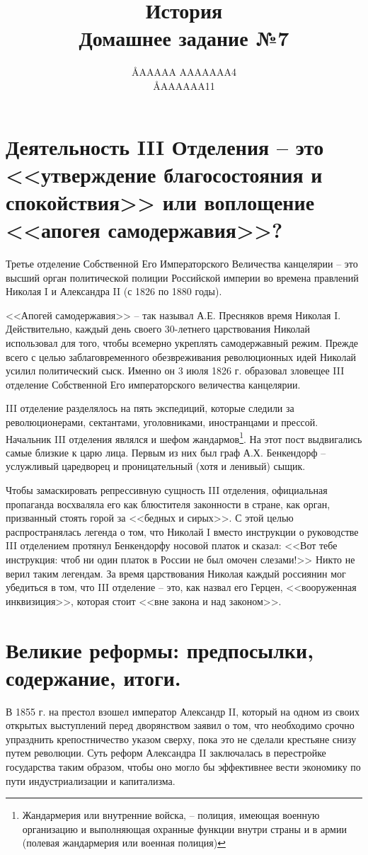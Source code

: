 \documentclass[12pt]{article}
\title{История \\ Домашнее задание №7}
\author{\AA{AAAAA AAAAAAA}{4} \\ \AA{AAAAAA}{11}}
\begin{document}
  \maketitle

  \section{Деятельность III Отделения -- это <<утверждение благосостояния и спокойствия>> или воплощение <<апогея самодержавия>>?}
  Третье отделение Собственной Его Императорского Величества канцелярии -- это высший орган политической полиции Российской империи во времена правлений Николая I и Александра II (с 1826 по 1880 годы).

  <<Апогей самодержавия>> -- так называл А.Е. Пресняков время Николая I.
  Действительно, каждый день своего 30-летнего царствования Николай использовал для того, чтобы всемерно укреплять самодержавный режим.
  Прежде всего с целью заблаговременного обезвреживания революционных идей Николай усилил политический сыск.
  Именно он 3 июля 1826 г. образовал зловещее III отделение Собственной Его императорского величества канцелярии.

  III отделение разделялось на пять экспедиций, которые следили за революционерами, сектантами, уголовниками, иностранцами и прессой.
  Начальник III отделения являлся и шефом жандармов\footnote{Жандармерия или внутренние войска, -- полиция, имеющая военную организацию и выполняющая охранные функции внутри страны и в армии (полевая жандармерия или военная полиция)}.
  На этот пост выдвигались самые близкие к царю лица.
  Первым из них был граф А.Х. Бенкендорф -- услужливый царедворец и проницательный (хотя и ленивый) сыщик.

  Чтобы замаскировать репрессивную сущность III отделения, официальная пропаганда восхваляла его как блюстителя законности в стране,
  как орган, призванный стоять горой за <<бедных и сирых>>.
  С этой целью распространялась легенда о том, что Николай I вместо инструкции о руководстве III отделением протянул Бенкендорфу носовой платок и сказал: <<Вот тебе инструкция: чтоб ни один платок в России не был омочен слезами!>>
  Никто не верил таким легендам.
  За время царствования Николая каждый россиянин мог убедиться в том, что III отделение -- это,
  как назвал его Герцен, <<вооруженная инквизиция>>, которая стоит <<вне закона и над законом>>.

  \setcounter{section}{3}
  \section{Великие реформы: предпосылки, содержание, итоги.}
  В 1855 г. на престол взошел император Александр II, который на одном из своих открытых выступлений перед дворянством заявил о том,
  что необходимо срочно упразднить крепостничество указом сверху, пока это не сделали крестьяне снизу путем революции.
  Суть реформ Александра II заключалась в перестройке государства таким образом,
  чтобы оно могло бы эффективнее вести экономику по пути индустриализации и капитализма.
\end{document}
